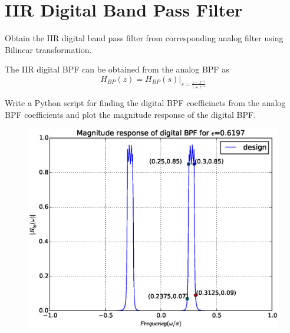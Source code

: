 \documentclass[journal,12pt,twocolumn]{IEEEtran}
\begin{document}
\section{IIR Digital Band Pass Filter}
\begin{problem}
Obtain the IIR digital band pass filter from corresponding analog filter using Bilinear transformation.
\end{problem}
\solution
The IIR digital BPF can be obtained from the analog BPF as
\begin{equation}
H_{BP}(z) = H_{BP}(s)|_{s=\frac{1-z^{-1}}{1+z^{-1}}}
\end{equation}
%
\begin{problem}
Write a Python script for finding the digital BPF coefficinets from the analog BPF coefficients and plot the magnitude response of the digital BPF.
\end{problem}
\solution

\begin{figure}
\centering
\includegraphics[width=\columnwidth]{./figs/digital_bpf.eps}
\caption{}
\label{fig:digital_bpf}
\end{figure}
\end{document}

